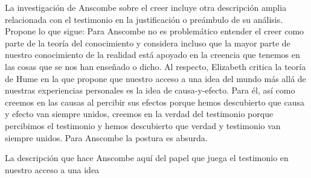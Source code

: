 La investigación de Anscombe sobre el creer incluye otra descripción amplia
relacionada con el testimonio en la justificación o preámbulo de su análisis.
Propone lo que sigue:  Para Anscombe no es problemático entender el creer como parte de
la teoría del conocimiento y considera incluso que la mayor parte de nuestro
conocimiento de la realidad está apoyado en la creencia que tenemos en las cosas
que se nos han enseñado o dicho\autocite[Cf.~][3]{anscombe2008faith:tobelieve}.
Al respecto, Elizabeth critica la teoría de Hume en la que propone que nuestro
acceso a una idea del mundo más allá de nuestras experiencias personales es la
idea de causa-y-efecto. Para él, así como creemos en las causas al percibir sus
efectos porque hemos descubierto que causa y efecto van siempre unidos, creemos
en la verdad del testimonio porque percibimos el testimonio y hemos descubierto
que verdad y testimonio van siempre unidos. Para Anscombe la postura es
absurda\autocite[Cf.~][3]{anscombe2008faith:tobelieve}.

La descripción que hace Anscombe aquí del papel que juega el testimonio en
nuestro acceso a una idea
